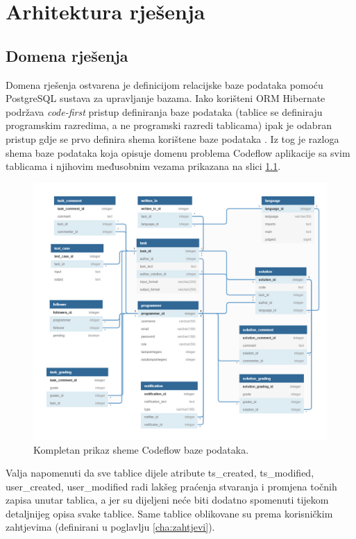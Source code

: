\documentclass[times, utf8, zavrsni, numeric]{fer}
\begin{document}
	\chapter{Arhitektura rješenja}
		\section{Domena rješenja}
		\label{sec:domenarjesenja}
		Domena rješenja ostvarena je definicijom relacijske baze podataka pomoću PostgreSQL sustava za upravljanje bazama. Iako korišteni ORM Hibernate podržava \textit{code-first} pristup definiranja baze podataka (tablice se definiraju  programskim razredima, a ne programski razredi tablicama) ipak je odabran pristup gdje se prvo definira shema korištene baze podataka . Iz tog je razloga shema baze podataka koja opisuje domenu problema Codeflow aplikacije sa svim tablicama i njihovim međusobnim vezama prikazana na slici \ref{fig:db}.
		\begin{figure}[H]
			\centering
			\includegraphics[width=\linewidth]{pictures/prikazi/Database.png}
			\caption{Kompletan prikaz sheme Codeflow baze podataka.}
			\label{fig:db}
		\end{figure}
		Valja napomenuti da sve tablice dijele atribute ts\_created, ts\_modified, user\_created, user\_modified radi lakšeg praćenja stvaranja i promjena točnih zapisa unutar tablica, a jer su dijeljeni neće biti dodatno spomenuti tijekom detaljnijeg opisa svake tablice. Same tablice oblikovane su prema korisničkim zahtjevima (definirani u poglavlju \ref{cha:zahtjevi}).
\end{document}
